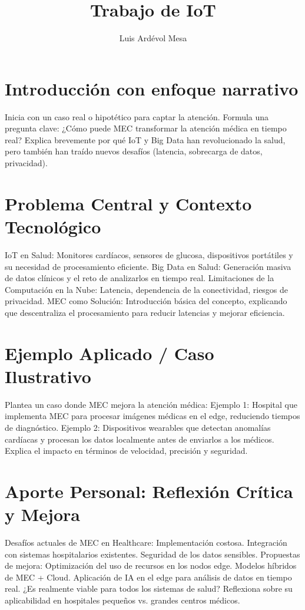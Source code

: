 \documentclass[11pt]{opticajnl}
\title{Trabajo de IoT}
\author[1,2,3]{Luis Ardévol Mesa}
\begin{document}
\maketitle

\section{Introducción con enfoque narrativo}

Inicia con un caso real o hipotético para captar la atención. Formula una pregunta clave: ¿Cómo puede MEC transformar la atención médica en tiempo real? Explica brevemente por qué IoT y Big Data han revolucionado la salud, pero también han traído nuevos desafíos (latencia, sobrecarga de datos, privacidad).

\section{Problema Central y Contexto Tecnológico}

IoT en Salud: Monitores cardíacos, sensores de glucosa, dispositivos portátiles y su necesidad de procesamiento eficiente.
Big Data en Salud: Generación masiva de datos clínicos y el reto de analizarlos en tiempo real.
Limitaciones de la Computación en la Nube: Latencia, dependencia de la conectividad, riesgos de privacidad.
MEC como Solución: Introducción básica del concepto, explicando que descentraliza el procesamiento para reducir latencias y mejorar eficiencia.

\section{Ejemplo Aplicado / Caso Ilustrativo}

Plantea un caso donde MEC mejora la atención médica:
Ejemplo 1: Hospital que implementa MEC para procesar imágenes médicas en el edge, reduciendo tiempos de diagnóstico.
Ejemplo 2: Dispositivos wearables que detectan anomalías cardíacas y procesan los datos localmente antes de enviarlos a los médicos.
Explica el impacto en términos de velocidad, precisión y seguridad.

\section{Aporte Personal: Reflexión Crítica y Mejora}

Desafíos actuales de MEC en Healthcare:
Implementación costosa.
Integración con sistemas hospitalarios existentes.
Seguridad de los datos sensibles.
Propuestas de mejora:
Optimización del uso de recursos en los nodos edge.
Modelos híbridos de MEC + Cloud.
Aplicación de IA en el edge para análisis de datos en tiempo real.
¿Es realmente viable para todos los sistemas de salud? Reflexiona sobre su aplicabilidad en hospitales pequeños vs. grandes centros médicos.
\end{document}

